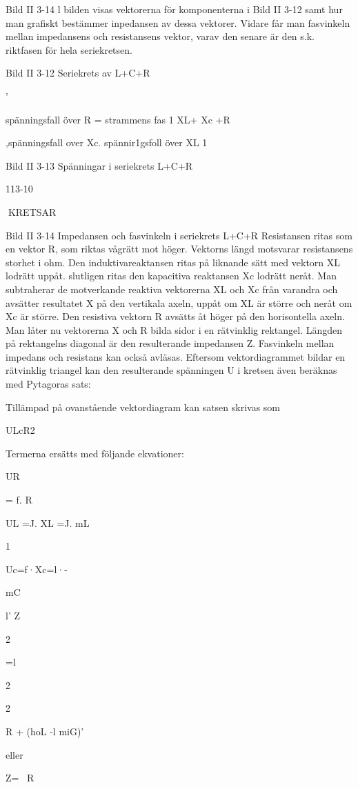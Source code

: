 \documentclass[a4paper,twoside,twocolumn,openright]{book}
\begin{document}
{{{{{Bild II 3-14
l bilden visas vektorerna för komponenterna i Bild II 3-12 samt hur man grafiskt
bestämmer inpedansen av dessa vektorer.
Vidare får man fasvinkeln mellan impedansens och resistansens vektor, varav den senare är den s.k. riktfasen för hela seriekretsen.

Bild II 3-12 Seriekrets av L+C+R

'

spänningsfall över R
= strammens fas 1 XL+ Xc +R

,spänningsfall over Xc.
spännir1gsfoll över XL
1

Bild II 3-13 Spänningar i seriekrets L+C+R

113-10

KRETSAR

Bild II 3-14 Impedansen och fasvinkeln i seriekrets L+C+R
Resistansen ritas som en vektor R, som
riktas vågrätt mot höger. Vektorns längd
motsvarar resistansens storhet i ohm.
Den induktivareaktansen ritas på liknande sätt med vektorn XL lodrätt uppåt. slutligen ritas den kapacitiva reaktansen Xc lodrätt neråt.
Man subtraherar de motverkande reaktiva vektorerna XL och Xc från varandra och
avsätter resultatet X på den vertikala axeln,
uppåt om XL är större och neråt om Xc är
större. Den resistiva vektorn R avsätts åt
höger på den horisontella axeln.
Man låter nu vektorerna X och R bilda
sidor i en rätvinklig rektangel. Längden på
rektangelns diagonal är den resulterande
impedansen Z. Fasvinkeln mellan impedans
och resistans kan också avläsas.
Eftersom vektordiagrammet bildar en rätvinklig triangel kan den resulterande spänningen U i kretsen även beräknas med
Pytagoras sats:

Tillämpad på ovanstående vektordiagram
kan satsen skrivas som

ULcR2

Termerna ersätts med följande ekvationer:

UR

= f. R

UL =J. XL =J. mL

1

Uc=f·Xc=l·-

mC

l' Z

2

=l

2

2

R + (hoL -l miG)'

eller

Z= ~R

}}}}}
\end{document}
